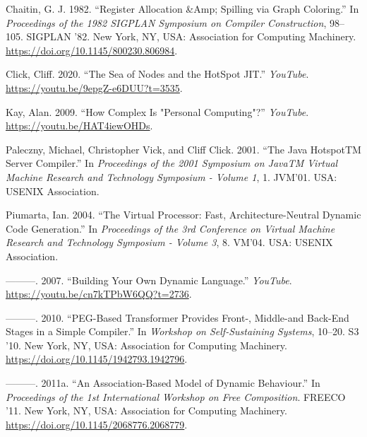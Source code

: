 \hypertarget{refs}{}
\begin{CSLReferences}{1}{0}
\leavevmode{}%
Chaitin, G. J. 1982. {``Register Allocation \&Amp; Spilling via Graph
Coloring.''} In \emph{Proceedings of the 1982 SIGPLAN Symposium on
Compiler Construction}, 98--105. SIGPLAN '82. New York, NY, USA:
Association for Computing Machinery.
\url{https://doi.org/10.1145/800230.806984}.

\leavevmode{}%
Click, Cliff. 2020. {``The Sea of Nodes and the HotSpot JIT.''}
\emph{YouTube}. \url{https://youtu.be/9epgZ-e6DUU?t=3535}.

\leavevmode{}%
Kay, Alan. 2009. {``How Complex Is "Personal Computing"?''}
\emph{YouTube}. \url{https://youtu.be/HAT4iewOHDs}.

\leavevmode{}%
Paleczny, Michael, Christopher Vick, and Cliff Click. 2001. {``The Java
HotspotTM Server Compiler.''} In \emph{Proceedings of the 2001 Symposium
on JavaTM Virtual Machine Research and Technology Symposium - Volume 1},
1. JVM'01. USA: USENIX Association.

\leavevmode{}%
Piumarta, Ian. 2004. {``The Virtual Processor: Fast,
Architecture-Neutral Dynamic Code Generation.''} In \emph{Proceedings of
the 3rd Conference on Virtual Machine Research and Technology Symposium
- Volume 3}, 8. VM'04. USA: USENIX Association.

\leavevmode{}%
---------. 2007. {``Building Your Own Dynamic Language.''}
\emph{YouTube}. \url{https://youtu.be/cn7kTPbW6QQ?t=2736}.

\leavevmode{}%
---------. 2010. {``PEG-Based Transformer Provides Front-, Middle-and
Back-End Stages in a Simple Compiler.''} In \emph{Workshop on
Self-Sustaining Systems}, 10--20. S3 '10. New York, NY, USA: Association
for Computing Machinery. \url{https://doi.org/10.1145/1942793.1942796}.

\leavevmode{}%
---------. 2011a. {``An Association-Based Model of Dynamic Behaviour.''}
In \emph{Proceedings of the 1st International Workshop on Free
Composition}. FREECO '11. New York, NY, USA: Association for Computing
Machinery. \url{https://doi.org/10.1145/2068776.2068779}.


\end{CSLReferences}
